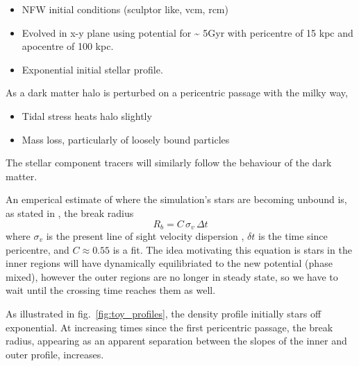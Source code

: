 \begin{itemize}
\item
  NFW initial conditions (sculptor like, vcm, rcm)
\item
  Evolved in x-y plane using \citet{EP2020} potential for
  \textasciitilde{} 5Gyr with pericentre of 15 kpc and apocentre of 100
  kpc.
\item
  Exponential initial stellar profile.
\end{itemize}

As a dark matter halo is perturbed on a pericentric passage with the
milky way,

\begin{itemize}
\tightlist
\item
  Tidal stress heats halo slightly
\item
  Mass loss, particularly of loosely bound particles
\end{itemize}

The stellar component tracers will similarly follow the behaviour of the
dark matter.

An emperical estimate of where the simulation's stars are becoming
unbound is, as stated in \citet{PNM2008}, the break radius \[
R_b = C\,\sigma_{v}\,\Delta t
\] where \(\sigma_v\) is the present line of sight velocity dispersion ,
\(\delta t\) is the time since pericentre, and \(C \approx 0.55\) is a
fit. The idea motivating this equation is stars in the inner regions
will have dynamically equilibriated to the new potential (phase mixed),
however the outer regions are no longer in steady state, so we have to
wait until the crossing time reaches them as well.

As illustrated in fig.~\ref{fig:toy_profiles}, the density profile
initially stars off exponential. At increasing times since the first
pericentric passage, the break radius, appearing as an apparent
separation between the slopes of the inner and outer profile, increases.
